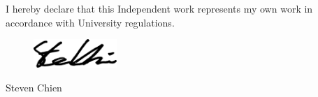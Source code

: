 \documentclass[letter, 11pt, oneside]{Thesis}  %
\begin{document}
\frontmatter      %

\title  {\titlename}
\addresses  {\groupname\\\deptname\\\univname}  %
\date       {\today}
\subject    {}
\keywords   {}

\maketitle


\fancyhead{}  %
\rhead{\thepage}  %
\lhead{}  %


\pagestyle{empty}

I hereby declare that this Independent work represents my own work in accordance with University regulations.
 
\begin{flushright}
    \begin{figure}[ht]
        \includegraphics[width=0.28\textwidth, right]{Images/steven_signature.png}
    \end{figure}
    Steven Chien
\end{flushright}

\clearpage %


\end{document}
